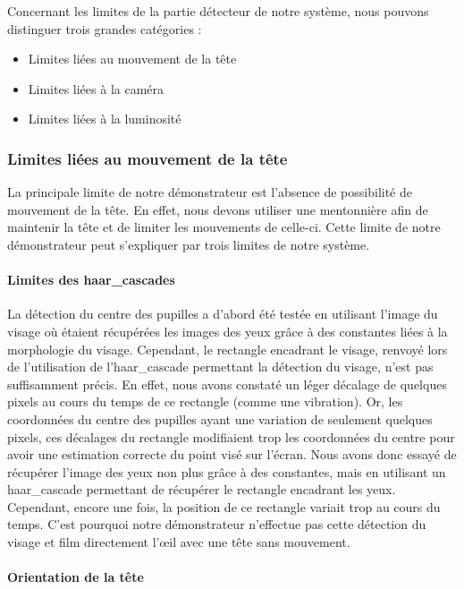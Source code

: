 Concernant les limites de la partie détecteur de notre système, nous pouvons distinguer trois grandes catégories :
\begin{itemize}[font=\tiny, label=]
\item Limites liées au mouvement de la tête
\item Limites liées à la caméra
\item Limites liées à la luminosité
\end{itemize}

\subsubsection{Limites liées au mouvement de la tête}

La principale limite de notre démonstrateur est l’absence de possibilité de mouvement de la tête. En effet, nous devons utiliser une mentonnière afin de maintenir la tête et de limiter les mouvements de celle-ci. Cette limite de notre démonstrateur peut s’expliquer par trois limites de notre système.

\paragraph{Limites des haar\_cascades}

La détection du centre des pupilles a d’abord été testée en utilisant l’image du visage où étaient récupérées les images des yeux grâce à des constantes liées à la morphologie du visage. Cependant, le rectangle encadrant le visage, renvoyé lors de l’utilisation de l’haar\_cascade permettant la détection du visage, n’est pas suffisamment précis. En effet, nous avons constaté un léger décalage de quelques pixels au cours du temps de ce rectangle (comme une vibration). Or, les coordonnées du centre des pupilles ayant une variation de seulement quelques pixels, ces décalages du rectangle modifiaient trop les coordonnées du centre pour avoir une estimation correcte du point visé sur l’écran. Nous avons donc essayé de récupérer l’image des yeux non plus grâce à des constantes, mais en utilisant un haar\_cascade permettant de récupérer le rectangle encadrant les yeux. Cependant, encore une fois, la position de ce rectangle variait trop au cours du temps. C’est pourquoi notre démonstrateur n’effectue pas cette détection du visage et film directement l’œil avec une tête sans mouvement.

\paragraph{Orientation de la tête}

